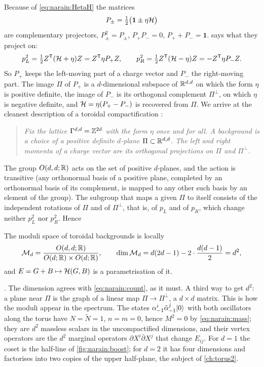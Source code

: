 Because of \eqref{eq:narain:HetaH} the matrices
\begin{equation}\label{eq:narain:projectors}
 P_\pm=\tfrac12\big(\mathbf 1\pm\eta\mathcal{H}\big)
\end{equation}
are complementary projectors, $P_\pm^2=P_\pm$, $P_+P_-=0$, $P_++P_-=\mathbf 1$.
 says what they project on:
\begin{equation}\label{eq:narain:pLsq}
 p_L^2=\tfrac12Z^{\mathsf T}(\mathcal{H}+\eta)Z=Z^{\mathsf T}\eta P_+Z,\qquad
 p_R^2=\tfrac12Z^{\mathsf T}(\mathcal{H}-\eta)Z=-Z^{\mathsf T}\eta P_-Z .
\end{equation}
So $P_+$ keeps the left-moving part of a charge vector and $P_-$ the right-moving part. The
image $\Pi$ of $P_+$ is a $d$-dimensional subspace of $\mathbb{R}^{d,d}$ on which the form $\eta$ is
positive definite, the image of $P_-$ is its orthogonal complement $\Pi^\perp$, on which
$\eta$ is negative definite, and $\mathcal{H}=\eta(P_+-P_-)$ is recovered from $\Pi$. We arrive at
the cleanest description of a toroidal compactification
:

\begin{quote}
\emph{Fix the lattice $\Gamma^{d,d}=\mathbb{Z}^{2d}$ with the form $\eta$ once and for all. A
background is a choice of a positive definite $d$-plane $\Pi\subset\mathbb{R}^{d,d}$. The left and
right momenta of a charge vector are its orthogonal projections on $\Pi$ and $\Pi^\perp$.}
\end{quote}

The group $O(d,d;\mathbb{R})$ acts on the set of positive $d$-planes, and the action is transitive
(any orthonormal basis of a positive plane, completed by an orthonormal basis of its
complement, is mapped to any other such basis by an element of the group). The subgroup that
maps a given $\Pi$ to itself consists of the independent rotations of $\Pi$ and of
$\Pi^\perp$, that is, of $p_L$ and of $p_R$, which change neither $p_L^2$ nor $p_R^2$. Hence

\begin{theorem}[\TL]\label{thm:narain:moduli}
The moduli space of toroidal backgrounds is locally
\begin{equation}\label{eq:narain:coset}
 \mathcal M_d=\frac{O(d,d;\mathbb{R})}{O(d;\mathbb{R})\times O(d;\mathbb{R})},\qquad
 \dim\mathcal M_d=d(2d-1)-2\cdot\frac{d(d-1)}2=d^2 ,
\end{equation}
and $E=G+B\mapsto\mathcal{H}(G,B)$ is a parametrisation of it.
\end{theorem}
\noindent{}. The dimension agrees with
\eqref{eq:narain:count}, as it must. A third way to get $d^2$: a plane near $\Pi$ is the
graph of a linear map $\Pi\to\Pi^\perp$, a $d\times d$ matrix. This is how the moduli appear
in the spectrum. The states $\alpha^i_{-1}\tilde\alpha^j_{-1}|0\rangle$ with both
oscillators along the torus have $N=\tilde N=1$, $n=m=0$, hence $M^2=0$ by
\eqref{eq:narain:mass}; they are $d^2$ massless scalars in the uncompactified dimensions, and
their vertex operators are the $d^2$ marginal operators
$\partial X^i\bar\partial X^j$ that change $E_{ij}$. For $d=1$ the coset is the half-line of
\cref{fig:narain:boost}; for $d=2$ it has four dimensions and factorises into two copies of
the upper half-plane, the subject of \cref{ch:torus2}.

